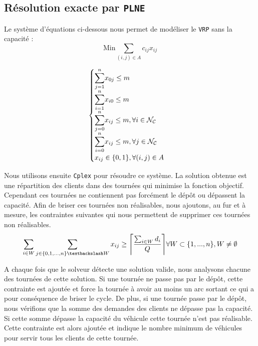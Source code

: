 \subsection{Résolution exacte par \texttt{PLNE}}
\label{S resolution exacte par plne}
Le système d'équations ci-dessous nous permet de modéliser le \texttt{VRP} sans la capacité :
\[\text{Min} \sum_{(i, j) \in A} c_{ij}x_{ij}\]

\[\begin{cases}
{\mathlarger\sum_{j=1}^{n}} x_{0j} \leq m \\
{\mathlarger\sum_{i=1}^{n}} x_{i0} \leq m\\
{\mathlarger\sum_{j=0}^{n}} x_{ij} \leq m, \forall i \in \mathcal{N}_{\mathcal{C}}\\
{\mathlarger\sum_{i=0}^{n}} x_{ij} \leq m, \forall j \in \mathcal{N}_{\mathcal{C}}\\
x_{ij} \in \{0,1\}, \forall (i, j) \in A
\end{cases}\]

Nous utilisons ensuite \texttt{Cplex} pour résoudre ce système. La solution obtenue est une répartition des clients dans des tournées qui minimise la fonction objectif. Cependant ces tournées ne contiennent pas forcément le dépôt ou dépassent la capacité. Afin de briser ces tournées non réalisables, nous ajoutons, au fur et à mesure, les contraintes suivantes qui nous permettent de supprimer ces tournées non réalisables.
\[
\sum_{i \in W} \sum_{j \in \{0, 1, ..., n\} \textbackslash W } x_{ij} \geq {\Bigg\lceil} \dfrac{\sum_{i \in W} d_i}{Q} {\Bigg\rceil} \forall W \subset \{1, ..., n\}, W \neq \emptyset
\]

A chaque fois que le solveur détecte une solution valide, nous analysons chacune des tournées de cette solution. Si une tournée ne passe pas par le dépôt, cette contrainte est ajoutée et force la tournée à avoir au moins un arc sortant ce qui a pour conséquence de briser le cycle. De plus, si une tournée passe par le dépôt, nous vérifions que la somme des demandes des clients ne dépasse pas la capacité. Si cette somme dépasse la capacité du véhicule cette tournée n'est pas réalisable. Cette contrainte est alors ajoutée et indique le nombre minimum de véhicules pour servir tous les clients de cette tournée.
